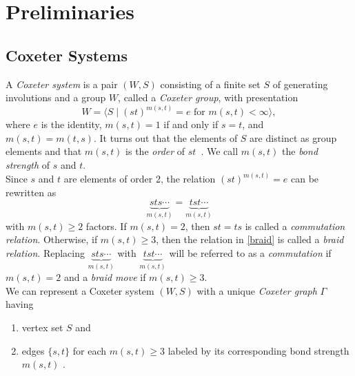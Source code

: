 \chapter{Preliminaries}



\section{Coxeter Systems}\label{sec:coxeter}
A \emph{Coxeter system} is a pair $(W,S)$ consisting of a finite set $S$ of generating involutions and a group $W$, called a \emph{Coxeter group}, with presentation 
\[ 
W = \langle S \mid (st)^{m(s, t)} = e \text{ for } m(s, t) < \infty \rangle,
\]
where $e$ is the identity, $m(s,t) = 1$ if and only if $s = t$, and $m(s,t) = m(t,s)$. It turns out that the elements of $S$ are distinct as group elements and that $m(s,t)$ is the \emph\emph{order} of $st$~\cite{Humphreys1990}. We call $m(s,t)$ the \emph{bond strength} of $s$ and $t$.\\

Since $s$ and $t$ are elements of order 2, the relation $(st)^{m(s,t)}=e$ can be rewritten as
\begin{equation}\label{braid} 
	\underbrace{sts \cdots}_{m(s,t)}=\underbrace{tst\cdots}_{m(s,t)}
\end{equation}
with $m(s,t) \geq 2$ factors. If $m(s,t)=2$, then $st=ts$ is called a \emph{commutation relation}. Otherwise, if $m(s,t) \geq 3$, then the relation in \eqref{braid} is called a \emph{braid relation}. Replacing $\underbrace{sts\cdots}_{m(s,t)}$ with $\underbrace{tst\cdots}_{m(s,t)}$ will be referred to as a \emph{commutation} if $m(s,t)=2$ and a \emph{braid move} if $m(s,t) \geq 3$.\\

We can represent a Coxeter system $(W,S)$ with a unique \emph{Coxeter graph} $\Gamma$ having
\begin{enumerate}
\item vertex set $S$ and
\item edges $\{s, t\}$ for each $m(s,t) \geq 3$ labeled by its corresponding bond strength $m(s,t)$ .	
\end{enumerate}

